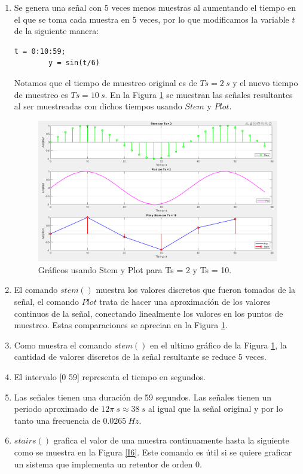 \documentclass[letterpaper,onecolumn,10pt,journal,final]{IEEEtran}
\begin{document}
\begin{enumerate}[{1)}]
    \item Se genera una señal con 5 veces menos muestras al aumentando el tiempo en el que se toma cada muestra en 5 veces, por lo que modificamos la variable $t$ de la siguiente manera:
    \begin{lstlisting}[frame=single]
        t = 0:10:59;
        y = sin(t/6)
    \end{lstlisting}
    Notamos que el tiempo de muestreo original es de $Ts=2~s$ y el nuevo tiempo de muestreo es $Ts = 10~s$.
    En la Figura \ref{I1} se muestran las señales resultantes al ser muestreadas con dichos tiempos usando $Stem$ y $Plot$.
    
    \begin{figure}[H]
    \centering
    \includegraphics[scale=0.5]{Figuras/plotI1.png}
    \caption{Gráficos usando Stem y Plot para Ts = 2 y Ts = 10.}\label{I1}
    \end{figure}
    
    \item El comando $stem()$  muestra los valores discretos que fueron tomados de la señal, el comando $Plot$ trata de hacer una aproximación de los valores continuos de la señal, conectando linealmente los valores en los puntos de muestreo. Estas comparaciones se aprecian en la Figura \ref{I1}.
    \item Como muestra el comando $stem()$ en el ultimo gráfico de la Figura \ref{I1}, la cantidad de valores discretos de la señal resultante se reduce 5 veces.
    \item El intervalo [0 59] representa el tiempo en segundos.
    \item Las señales tienen una duración de 59 segundos. Las señales tienen un periodo aproximado de $12\pi~s \approx 38~s$ al igual que la señal original y por lo tanto una frecuencia de $0.0265~Hz$. %
    \item $stairs()$ grafica el valor de una muestra continuamente hasta la siguiente como se muestra en la Figura \ref{I6}. Este comando es útil si se quiere graficar un sistema que implementa un retentor de orden 0.
    

\end{enumerate}
\end{document}
